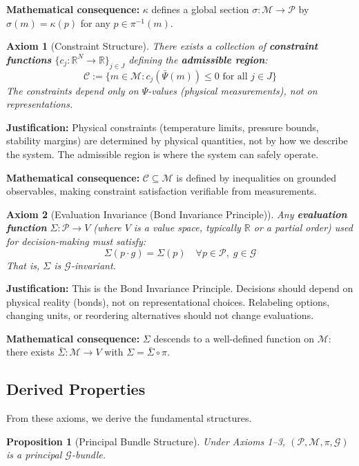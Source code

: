 \documentclass[11pt]{article}
\newtheorem{axiom}{Axiom}
\newtheorem{proposition}[theorem]{Proposition}
\begin{document}
\textbf{Mathematical consequence:} $\kappa$ defines a global section $\sigma : \mathcal{M} \to \mathcal{P}$ by $\sigma(m) = \kappa(p)$ for
any $p \in \pi^{-1}(m)$.

\begin{axiom}[Constraint Structure]
There exists a collection of \textbf{constraint functions} $\{c_j :
\mathbb{R}^N \to \mathbb{R}\}_{j \in J}$ defining the \textbf{admissible region}:
\[
\mathcal{C} := \{m \in \mathcal{M} : c_j(\bar{\Psi}(m)) \leq 0 \text{ for all } j \in J\}
\]
The constraints depend only on $\Psi$-values (physical measurements), not on representations.
\end{axiom}

\textbf{Justification:} Physical constraints (temperature limits, pressure bounds, stability margins)
are determined by physical quantities, not by how we describe the system. The admissible region
is where the system can safely operate.

\textbf{Mathematical consequence:} $\mathcal{C} \subseteq \mathcal{M}$ is defined by inequalities on grounded observables,
making constraint satisfaction verifiable from measurements.

\begin{axiom}[Evaluation Invariance (Bond Invariance Principle)]
Any \textbf{evaluation function}
$\Sigma : \mathcal{P} \to V$ (where $V$ is a value space, typically $\mathbb{R}$ or a partial order) used for decision-making
must satisfy:
\[
\Sigma(p \cdot g) = \Sigma(p) \quad \forall p \in \mathcal{P},\; g \in \mathcal{G}
\]
That is, $\Sigma$ is $\mathcal{G}$-invariant.
\end{axiom}

\textbf{Justification:} This is the Bond Invariance Principle. Decisions should depend on physical reality (bonds), not on representational choices. Relabeling options, changing units, or
reordering alternatives should not change evaluations.

\textbf{Mathematical consequence:} $\Sigma$ descends to a well-defined function on $\mathcal{M}$: there exists
$\bar{\Sigma} : \mathcal{M} \to V$ with $\Sigma = \bar{\Sigma} \circ \pi$.

\subsection{Derived Properties}

From these axioms, we derive the fundamental structures.

\begin{proposition}[Principal Bundle Structure]
\label{prop:bundle}
Under Axioms 1--3, $(\mathcal{P}, \mathcal{M}, \pi, \mathcal{G})$ is a principal $\mathcal{G}$-bundle.
\end{proposition}
\end{document}
